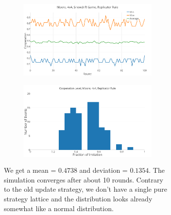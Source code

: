 \documentclass[a4paper, 11pt]{article}
\begin{document}
\begin{figure}[H]
\begin{subfigure}{.55\textwidth}
	\begin{subfigure}{1\textwidth}
		\includegraphics[width=1\linewidth]{SDMoore4x4}
	\end{subfigure}

	\begin{subfigure}{1\textwidth}
		\includegraphics[width=1\linewidth]{SDMoore4x4HG}
	\end{subfigure}
\end{subfigure}%
\begin{subfigure}{.45\textwidth}
	We get a mean = $0.4738$ and deviation = $0.1354$. The simulation converges after about 10 rounds. Contrary to the old update strategy, we don't have a single pure strategy lattice and the distribution looks already somewhat like a normal distribution.
\end{subfigure}

\end{figure}


\newpage
\end{document}
